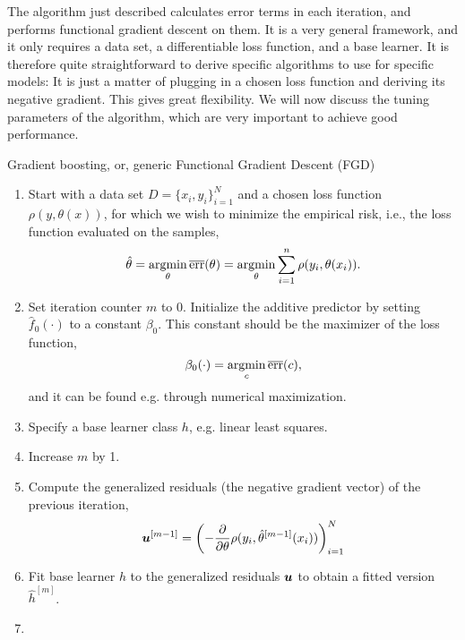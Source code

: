 The algorithm just described calculates error terms in each iteration, and performs functional gradient descent on them.
It is a very general framework, and it only requires a data set, a differentiable loss function, and a base learner.
It is therefore quite straightforward to derive specific algorithms to use for specific models:
It is just a matter of plugging in a chosen loss function and deriving its negative gradient.
This gives great flexibility.
We will now discuss the tuning parameters of the algorithm, which are very important to achieve good performance.

\begin{algorithm}
\caption{Gradient boosting, or, generic Functional Gradient Descent (FGD)}
\label{algo:fgd}
\begin{enumerate}
    \item
        Start with a data set $D=\{x_i, y_i\}_{i=1}^N$ and a chosen loss function $\rho(y,\theta(x))$, for which we wish to
        minimize the empirical risk, i.e., the loss function evaluated on the samples,
        \begin{equation*}
            \hat{\theta}=\operatorname*{argmin}_{\theta}\overline{\text{err}}(\theta)=\operatorname*{argmin}_{\theta}\sum_{i=1}^n\rho(y_{i},\theta(x_{i})).
        \end{equation*}
    \item
        Set iteration counter $m$ to 0.
        Initialize the additive predictor by setting $\hat{f}_0(\cdot)$ to a constant $\beta_0$.
        This constant should be the maximizer of the loss function,
        \begin{equation*}
            \beta_0(\cdot)=\operatorname*{argmin}_c \overline{\text{err}}(c),
        \end{equation*}
        and it can be found e.g. through numerical maximization.
    \item
        Specify a base learner class $h$, e.g. linear least squares.
    \item
        \label{algo-fgd-step-inc}
        Increase $m$ by 1.
    \item
        Compute the generalized residuals (the negative gradient vector) of the previous iteration,
        \begin{equation*}
            \bm{u}^{[m-1]}=\left(-\frac{\partial}{\partial \theta}\rho(y_i, \hat{\theta}^{[m-1]}(x_i))\right)_{i=1}^N
        \end{equation*}
    \item
        Fit base learner $h$ to the generalized residuals $\bm{u}$ to obtain a fitted version $\hat{h}^{[m]}$.
    \item

\end{enumerate}
\end{algorithm}
